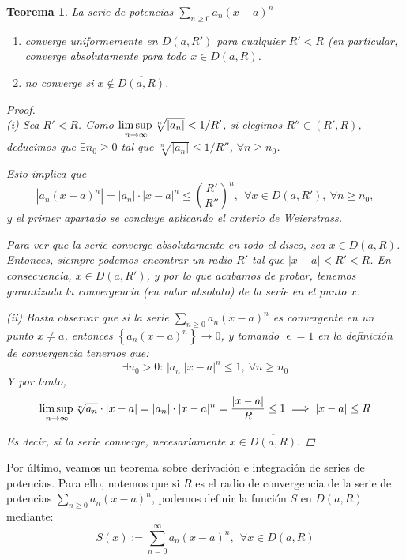 \documentclass[11pt, a4paper]{article}
\let\epsilon\upvarepsilon
\theoremstyle{theorem-style}
\newtheorem{nth}{Teorema}[section]
\theoremstyle{definition-style}
\theoremstyle{remark-style}
\theoremstyle{example-style}
\newenvironment{nlist}
{\begin{enumerate}
    \renewcommand\labelenumi{(\emph{\roman{enumi})}}}
  {\end{enumerate}}
\begin{document}
\begin{nth} \label{13}
  La serie de potencias $\displaystyle\sum_{n\geq 0} a_n (x-a)^n$  
  \begin{nlist}
  \item converge uniformemente en $D(a,R')$ para cualquier $R'<R$ (en particular, converge absolutamente para todo $x\in D(a,R)$.
  \item no converge si $x\not\in \overline{D(a,R)}$.
  \end{nlist}

  \begin{proof} \hfill \\
    \textit{(i)} Sea $R'<R$. Como $\underset{n\to\infty}{\mbox{lim\,sup\,}} \sqrt[n]{|a_n|} < 1/R'$, si elegimos $R''\in (R',R)$, deducimos que $\exists n_0\geq 0$ tal que $\sqrt[n]{|a_n|} \leq 1/R''$, $\forall n\geq n_0$.

    Esto implica que
    \[
      \left| a_n (x-a)^n\right| = |a_n|\cdot|x-a|^n \leq \left(\frac{R'}{R''}\right)^n, \ \ \forall x\in D(a,R'), \ \forall n\geq n_0,
    \]
    y el primer apartado se concluye aplicando el criterio de Weierstrass.

    Para ver que la serie converge absolutamente en todo el disco, sea $x \in D(a,R)$. Entonces, siempre podemos encontrar un radio $R'$ tal que $|x-a| < R' < R$. En consecuencia, $x \in D(a,R')$, y por lo que acabamos de probar, tenemos garantizada la convergencia (en valor absoluto) de la serie en el punto $x$. 

    \textit{(ii)} Basta observar que si la serie $\sum_{n\geq 0} a_n (x-a)^n$ es convergente en un punto $x\not= a$, entonces $\left\{ a_n (x-a)^n \right\} \to 0$, y tomando $\epsilon = 1$ en la definición de convergencia tenemos que:
    \[
      \exists n_0>0: \,  |a_n| |x-a|^n \leq 1, \ \forall n\geq n_0
    \]
    Y por tanto, $$\underset{n\to\infty}{\mbox{lim\,sup\,}} \sqrt[n]{a_n} \cdot |x-a| = |a_n| \cdot |x-a|^n =\frac{|x-a|}{R} \leq 1 \implies |x-a| \le R$$

    Es decir, si la serie converge, necesariamente $x \in \overline{D(a,R)}.$
  \end{proof}
\end{nth}

Por último, veamos un teorema sobre derivación e integración de series de potencias. Para ello, notemos que si $R$ es el radio de convergencia de la serie de potencias $\displaystyle\sum_{n\geq 0} a_n (x-a)^n$, podemos definir la función $S$ en $D(a,R)$ mediante: \[ 
  S(x):= \sum_{n= 0}^\infty a_n (x-a)^n
  , \ \ \forall x\in  D(a,R)
\] 
\end{document}

